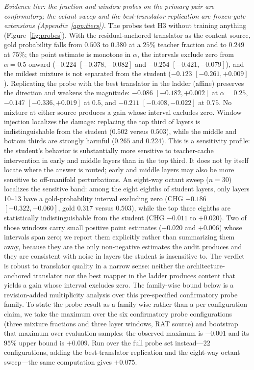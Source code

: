 \documentclass{article} %
\begin{document}
\emph{Evidence tier: the fraction and window probes on the primary pair are
confirmatory; the octant sweep and the best-translator replication are
frozen-gate extensions (Appendix~\ref{app:tiers}).}
The probes test H3 without training anything (Figure~\ref{fig:probes}). With the
residual-anchored translator as the content source, gold probability falls from
$0.503$ to $0.380$ at a $25\%$ teacher fraction and to $0.249$ at $75\%$; the
point estimate is monotone in $\alpha$, the intervals exclude zero from
$\alpha{=}0.5$ onward ($-0.224$ $[-0.378, -0.082]$ and $-0.254$
$[-0.421, -0.079]$), and the mildest mixture is not separated from the student
($-0.123$ $[-0.261, +0.009]$). Replicating the probe with the best translator in
the ladder (affine) preserves the direction and weakens the magnitude: $-0.086$
$[-0.182, +0.002]$ at $\alpha{=}0.25$, $-0.147$ $[-0.336, +0.019]$ at $0.5$, and
$-0.211$ $[-0.408, -0.022]$ at $0.75$. No mixture at either source produces a
gain whose interval excludes zero. Window injection localizes the damage:
replacing the top third of layers is indistinguishable from the student
($0.502$ versus $0.503$), while the middle and bottom thirds are strongly
harmful ($0.265$ and $0.224$). This is a sensitivity profile: the student's
behavior is substantially more sensitive to teacher-cache intervention in
early and middle layers than in the top third. It does not by itself locate
where the answer is routed; early and middle layers may also be more sensitive
to off-manifold perturbations. An eight-way octant sweep ($n{=}30$)
localizes the sensitive band: among the eight eighths of student layers, only
layers 10--13 have a gold-probability interval excluding zero (CHG $-0.186$
$[-0.322, -0.060]$, gold $0.317$ versus $0.503$), while the top three eighths
are statistically indistinguishable from the student (CHG $-0.011$ to
$+0.020$). Two of those windows carry small positive point estimates
($+0.020$ and $+0.006$) whose intervals span zero; we report them explicitly
rather than summarizing them away, because they are the only non-negative
estimates the audit produces and they are consistent with noise in layers the
student is insensitive to. The verdict is robust to translator quality in a
narrow sense: neither the architecture-anchored translator nor the best mapper
in the ladder produces content that yields a gain whose interval excludes zero.
The family-wise bound below is a revision-added multiplicity analysis over this pre-specified
confirmatory probe family. To state the probe result as a family-wise rather than a per-configuration claim, we take
the maximum over the six confirmatory probe configurations (three mixture
fractions and three layer windows, RAT source) and bootstrap that maximum over
evaluation samples: the observed maximum is $-0.001$ and its $95\%$ upper bound
is $+0.009$. Run over the full probe set instead---$22$ configurations, adding the
best-translator replication and the eight-way octant sweep---the same
computation gives $+0.075$.
\end{document}
